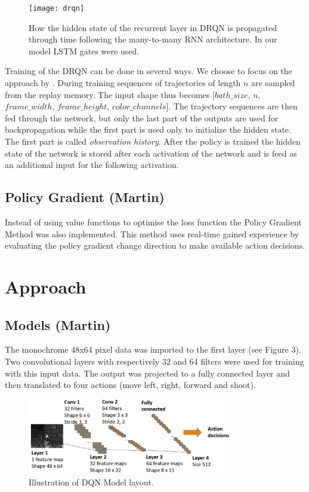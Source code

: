 \documentclass{article}
\begin{document}
\begin{figure}[htb]

\begin{minipage}[b]{1.0\linewidth}
  \centering
  \centerline{\texttt{[image: drqn]}}
\end{minipage}
\caption{How the hidden state of the recurrent layer in DRQN is propagated through time following the many-to-many RNN architecture. In our model LSTM gates were used.}
\label{fig:res}
%
\end{figure}

Training of the DRQN can be done in several ways. We choose to focus on the approach by \cite{lample2016playing}. During training sequences of trajectories of length $n$ are sampled from the replay memory. The input shape thus becomes [$bath\_size$, $n$, $frame\_width$, $frame\_height$, $color\_channels$]. The trajectory sequences are then fed through the network, but only the last part of the outputs are used for backpropagation while the first part is used only to initialize the hidden state. The first part is called \emph{observation history}. After the policy is trained the hidden state of the network is stored after each activation of the network and is feed as an additional input for the following activation. 

\subsection{Policy Gradient (Martin)}

Instead of using value functions to optimise the loss function the Policy Gradient Method was also implemented. This method uses real-time gained experience by evaluating the policy gradient change direction to make available action decisions.

\section{Approach}
\label{sec:pagestyle}

\subsection{Models (Martin)}

The monochrome 48x64 pixel data was imported to the first layer (see Figure 3). Two convolutional layers with respectively 32 and 64 filters were used for training with this input data. The output was projected to a fully connected layer and then translated to four actions (move left, right, forward and shoot).
\begin{figure}[!htb]
  \includegraphics[width=0.8\textwidth]{model}
  \centering
  \caption{Illustration of DQN Model layout. 
  }
\end{figure} 
\end{document}
